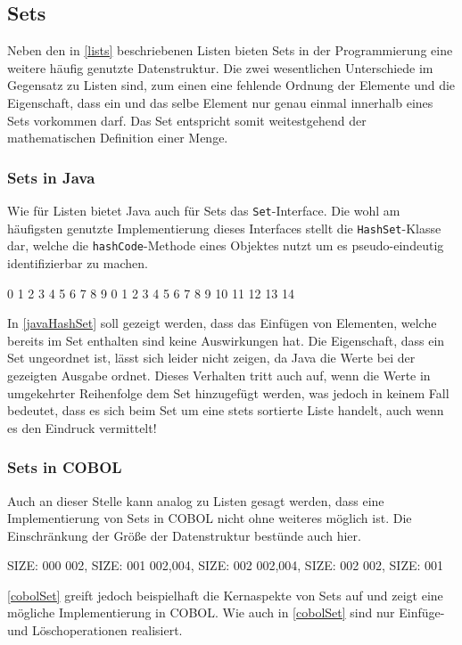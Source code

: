 \subsection{Sets}
Neben den in \autoref{lists} beschriebenen Listen bieten Sets in der Programmierung eine weitere häufig genutzte Datenstruktur. Die zwei wesentlichen Unterschiede im Gegensatz zu Listen sind, zum einen eine fehlende Ordnung der Elemente und die Eigenschaft, dass ein und das selbe Element nur genau einmal innerhalb eines Sets vorkommen darf. Das Set entspricht somit weitestgehend der mathematischen Definition einer Menge.\\

\subsubsection*{Sets in Java}
Wie für Listen bietet Java auch für Sets das \texttt{Set}-Interface. Die wohl am häufigsten genutzte Implementierung dieses Interfaces stellt die \texttt{HashSet}-Klasse dar, welche die \texttt{hashCode}-Methode eines Objektes nutzt um es pseudo-eindeutig identifizierbar zu machen.\\

\begin{shellwindow}
0 1 2 3 4 5 6 7 8 9 
0 1 2 3 4 5 6 7 8 9 10 11 12 13 14 
\end{shellwindow}

In \autoref{javaHashSet} soll gezeigt werden, dass das Einfügen von Elementen, welche bereits im Set enthalten sind keine Auswirkungen hat. Die Eigenschaft, dass ein Set ungeordnet ist, lässt sich leider nicht zeigen, da Java die Werte bei der gezeigten Ausgabe ordnet. Dieses Verhalten tritt auch auf, wenn die Werte in umgekehrter Reihenfolge dem Set hinzugefügt werden, was jedoch in keinem Fall bedeutet, dass es sich beim Set um eine stets sortierte Liste handelt, auch wenn es den Eindruck vermittelt!\\

\subsubsection*{Sets in COBOL}
Auch an dieser Stelle kann analog zu Listen gesagt werden, dass eine Implementierung von Sets in COBOL nicht ohne weiteres möglich ist. Die Einschränkung der Größe der Datenstruktur bestünde auch hier. 

\begin{shellwindow}
 SIZE: 000
002, SIZE: 001
002,004, SIZE: 002
002,004, SIZE: 002
002, SIZE: 001
\end{shellwindow}

\autoref{cobolSet} greift jedoch beispielhaft die Kernaspekte von Sets auf und zeigt eine mögliche Implementierung in COBOL. Wie auch in \autoref{cobolSet} sind nur Einfüge- und Löschoperationen realisiert.
